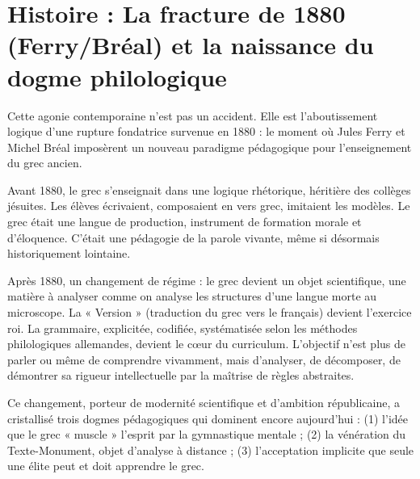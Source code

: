 
\section*{Histoire : La fracture de 1880 (Ferry/Bréal) et la naissance du dogme philologique}

Cette agonie contemporaine n'est pas un accident. Elle est l'aboutissement logique d'une rupture fondatrice survenue en 1880 : le moment où Jules Ferry et Michel Bréal imposèrent un nouveau paradigme pédagogique pour l'enseignement du grec ancien.

Avant 1880, le grec s'enseignait dans une logique rhétorique, héritière des collèges jésuites. Les élèves écrivaient, composaient en vers grec, imitaient les modèles. Le grec était une langue de production, instrument de formation morale et d'éloquence. C'était une pédagogie de la parole vivante, même si désormais historiquement lointaine.

Après 1880, un changement de régime : le grec devient un objet scientifique, une matière à analyser comme on analyse les structures d'une langue morte au microscope. La « Version » (traduction du grec vers le français) devient l'exercice roi. La grammaire, explicitée, codifiée, systématisée selon les méthodes philologiques allemandes, devient le cœur du curriculum. L'objectif n'est plus de parler ou même de comprendre vivamment, mais d'analyser, de décomposer, de démontrer sa rigueur intellectuelle par la maîtrise de règles abstraites.

Ce changement, porteur de modernité scientifique et d'ambition républicaine, a cristallisé trois dogmes pédagogiques qui dominent encore aujourd'hui : (1) l'idée que le grec « muscle » l'esprit par la gymnastique mentale ; (2) la vénération du Texte-Monument, objet d'analyse à distance ; (3) l'acceptation implicite que seule une élite peut et doit apprendre le grec.
